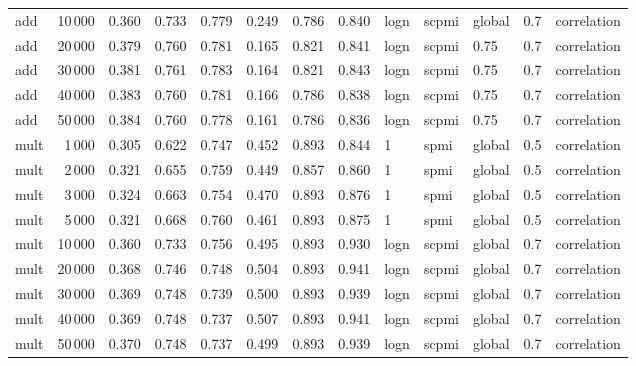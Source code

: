 \begin{tabular}{lrrrrrrrlllll}
     add &           10\,000 &      0.360 &  0.733 &  0.779 &  0.249 &      0.786 &      0.840 &  logn &  scpmi &  global &  0.7 &    correlation \\
     add &           20\,000 &      0.379 &  0.760 &  0.781 &  0.165 &      0.821 &      0.841 &  logn &  scpmi &    0.75 &  0.7 &    correlation \\
     add &           30\,000 &      0.381 &  0.761 &  0.783 &  0.164 &      0.821 &      0.843 &  logn &  scpmi &    0.75 &  0.7 &    correlation \\
     add &           40\,000 &      0.383 &  0.760 &  0.781 &  0.166 &      0.786 &      0.838 &  logn &  scpmi &    0.75 &  0.7 &    correlation \\
     add &           50\,000 &      0.384 &  0.760 &  0.778 &  0.161 &      0.786 &      0.836 &  logn &  scpmi &    0.75 &  0.7 &    correlation \\
    mult &            1\,000 &      0.305 &  0.622 &  0.747 &  0.452 &      0.893 &      0.844 &     1 &   spmi &  global &  0.5 &    correlation \\
    mult &            2\,000 &      0.321 &  0.655 &  0.759 &  0.449 &      0.857 &      0.860 &     1 &   spmi &  global &  0.5 &    correlation \\
    mult &            3\,000 &      0.324 &  0.663 &  0.754 &  0.470 &      0.893 &      0.876 &     1 &   spmi &  global &  0.5 &    correlation \\
    mult &            5\,000 &      0.321 &  0.668 &  0.760 &  0.461 &      0.893 &      0.875 &     1 &   spmi &  global &  0.5 &    correlation \\
    mult &           10\,000 &      0.360 &  0.733 &  0.756 &  0.495 &      0.893 &      0.930 &  logn &  scpmi &  global &  0.7 &    correlation \\
    mult &           20\,000 &      0.368 &  0.746 &  0.748 &  0.504 &      0.893 &      0.941 &  logn &  scpmi &  global &  0.7 &    correlation \\
    mult &           30\,000 &      0.369 &  0.748 &  0.739 &  0.500 &      0.893 &      0.939 &  logn &  scpmi &  global &  0.7 &    correlation \\
    mult &           40\,000 &      0.369 &  0.748 &  0.737 &  0.507 &      0.893 &      0.941 &  logn &  scpmi &  global &  0.7 &    correlation \\
    mult &           50\,000 &      0.370 &  0.748 &  0.737 &  0.499 &      0.893 &      0.939 &  logn &  scpmi &  global &  0.7 &    correlation \\

\end{tabular}
